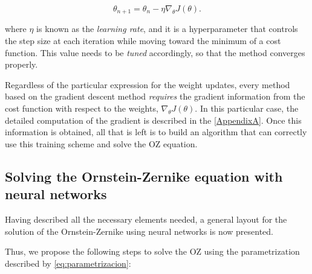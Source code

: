\begin{equation}
    \theta_{n+1} = \theta_n - \eta \nabla_{\theta} J(\theta) .
    \label{eq:gradiente}
\end{equation}

where $\eta$ is known as the \emph{learning rate}, and it is a hyperparameter
that controls the step size at each iteration while moving toward the minimum
of a cost function. This value needs to be \emph{tuned} accordingly, so
that the method converges properly.

Regardless of the particular expression for the weight updates, every method
based on the gradient descent method \emph{requires} the gradient information from
the cost function with respect to the weights, $\nabla_{\theta} J(\theta)$.
In this particular case, the detailed computation of the gradient is described in
the \autoref{AppendixA}.
Once this information is obtained, all that is left is to build an algorithm that
can correctly use this training scheme and solve the OZ equation.

\subsection{Solving the Ornstein-Zernike equation with neural networks}
Having described all the necessary elements needed, a general layout for the solution
of the Ornstein-Zernike using neural networks is now presented.

Thus, we propose the following steps to solve the OZ using the parametrization
described by \autoref{eq:parametrizacion}:

